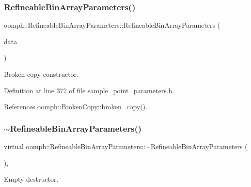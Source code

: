 \subsubsection{\texorpdfstring{Refineable\+Bin\+Array\+Parameters()}{RefineableBinArrayParameters()}\hspace{0.1cm}{\footnotesize\ttfamily [2/2]}}
{\footnotesize\ttfamily oomph\+::\+Refineable\+Bin\+Array\+Parameters\+::\+Refineable\+Bin\+Array\+Parameters (\begin{DoxyParamCaption}\item[{const \hyperlink{classoomph_1_1RefineableBinArrayParameters}{Refineable\+Bin\+Array\+Parameters} \&}]{data }\end{DoxyParamCaption})\hspace{0.3cm}{\ttfamily [inline]}}



Broken copy constructor. 



Definition at line 377 of file sample\+\_\+point\+\_\+parameters.\+h.



References oomph\+::\+Broken\+Copy\+::broken\+\_\+copy().

\mbox{\label{classoomph_1_1RefineableBinArrayParameters_afc0752c4b4731443b5ec6e960afa61ae}} 
\subsubsection{\texorpdfstring{$\sim$\+Refineable\+Bin\+Array\+Parameters()}{~RefineableBinArrayParameters()}}
{\footnotesize\ttfamily virtual oomph\+::\+Refineable\+Bin\+Array\+Parameters\+::$\sim$\+Refineable\+Bin\+Array\+Parameters (\begin{DoxyParamCaption}{ }\end{DoxyParamCaption})\hspace{0.3cm}{\ttfamily [inline]}, {\ttfamily [virtual]}}



Empty destructor. 



